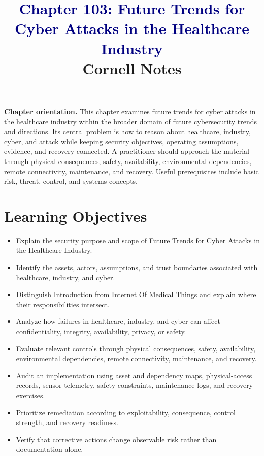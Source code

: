 \documentclass[11pt]{article}
\title{\textcolor{Navy}{Chapter 103: Future Trends for Cyber Attacks in the Healthcare Industry}\\[2mm]\large Cornell Notes}
\author{}
\date{}
\begin{document}
\maketitle
\thispagestyle{fancy}
\vspace{-1.5em}
\begin{orientationbox}
\textbf{Chapter orientation.} This chapter examines future trends for cyber attacks in the healthcare industry within the broader domain of future cybersecurity trends and directions. Its central problem is how to reason about healthcare, industry, cyber, and attack while keeping security objectives, operating assumptions, evidence, and recovery connected. A practitioner should approach the material through physical consequences, safety, availability, environmental dependencies, remote connectivity, maintenance, and recovery. Useful prerequisites include basic risk, threat, control, and systems concepts.
\end{orientationbox}
\section*{Learning Objectives}
\begin{itemize}
\item Explain the security purpose and scope of Future Trends for Cyber Attacks in the Healthcare Industry.
\item Identify the assets, actors, assumptions, and trust boundaries associated with healthcare, industry, and cyber.
\item Distinguish Introduction from Internet Of Medical Things and explain where their responsibilities intersect.
\item Analyze how failures in healthcare, industry, and cyber can affect confidentiality, integrity, availability, privacy, or safety.
\item Evaluate relevant controls through physical consequences, safety, availability, environmental dependencies, remote connectivity, maintenance, and recovery.
\item Audit an implementation using asset and dependency maps, physical-access records, sensor telemetry, safety constraints, maintenance logs, and recovery exercises.
\item Prioritize remediation according to exploitability, consequence, control strength, and recovery readiness.
\item Verify that corrective actions change observable risk rather than documentation alone.
\end{itemize}
\end{document}
